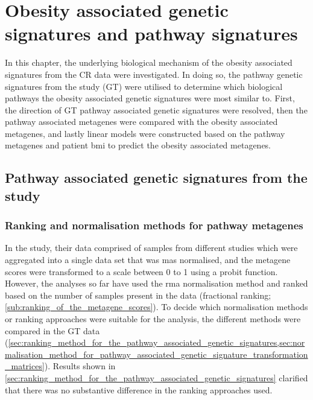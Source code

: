 \chapter{Obesity associated genetic signatures and pathway signatures}
\label{cha:obesity_associated_genetic_signature_and_pathway_signatures}

In this chapter, the underlying biological mechanism of the obesity associated signatures from the CR data were investigated.
In doing so, the pathway genetic signatures from the \citet{Gatza2010a} study (GT) were utilised to determine which biological pathways the obesity associated genetic signatures were most similar to.
First, the direction of GT pathway associated genetic signatures were resolved, then the pathway associated metagenes were compared with the obesity associated metagenes, and lastly linear models were constructed based on the pathway metagenes and patient \gls{bmi} to predict the obesity associated metagenes.

\section{Pathway associated genetic signatures from the\\\citet{Gatza2010a} study}
\label{sec:pathway_associated_genetic_signatures_from_gatza2010a_study}

\subsection{Ranking and normalisation methods for pathway metagenes}
\label{sub:ranking_and_normalisation_methods}

In the \citet{Gatza2010a} study, their data comprised of samples from different studies which were aggregated into a single data set that was \gls{mas} normalised, and the metagene scores were transformed to a scale between 0 to 1 using a probit function.
However, the analyses so far have used the \gls{rma} normalisation method and ranked based on the number of samples present in the data (fractional ranking; \cref{sub:ranking_of_the_metagene_scores}).
To decide which normalisation methods or ranking approaches were suitable for the analysis, the different methods were compared in the GT data (\cref{sec:ranking_method_for_the_pathway_associated_genetic_signatures,sec:normalisation_method_for_pathway_associated_genetic_signature_transformation_matrices}).
Results shown in \cref{sec:ranking_method_for_the_pathway_associated_genetic_signatures} clarified that there was no substantive difference in the ranking approaches used.

